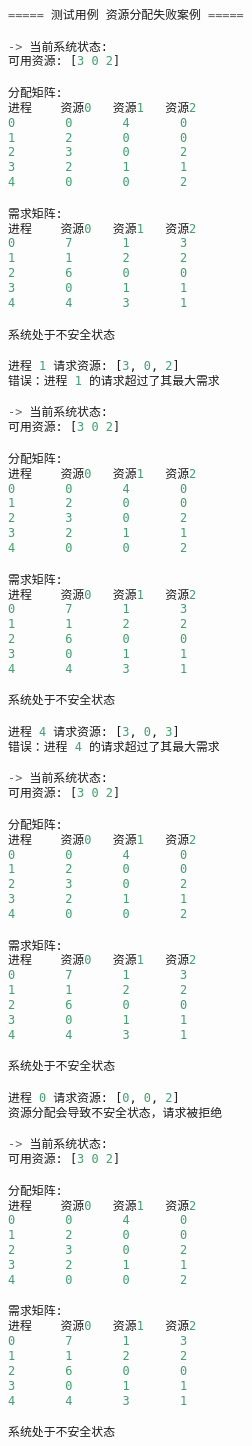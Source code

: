 \documentclass[12pt, a4paper, oneside]{ctexart}
\begin{document}
\begin{lstlisting}[language=Python, caption=测试用例二运行结果]
===== 测试用例 资源分配失败案例 =====

-> 当前系统状态:
可用资源: [3 0 2]

分配矩阵:
进程    资源0   资源1   资源2
0       0       4       0
1       2       0       0
2       3       0       2
3       2       1       1
4       0       0       2

需求矩阵:
进程    资源0   资源1   资源2
0       7       1       3
1       1       2       2
2       6       0       0
3       0       1       1
4       4       3       1

系统处于不安全状态

进程 1 请求资源: [3, 0, 2]
错误：进程 1 的请求超过了其最大需求

-> 当前系统状态:
可用资源: [3 0 2]

分配矩阵:
进程    资源0   资源1   资源2
0       0       4       0
1       2       0       0
2       3       0       2
3       2       1       1
4       0       0       2

需求矩阵:
进程    资源0   资源1   资源2
0       7       1       3
1       1       2       2
2       6       0       0
3       0       1       1
4       4       3       1

系统处于不安全状态

进程 4 请求资源: [3, 0, 3]
错误：进程 4 的请求超过了其最大需求

-> 当前系统状态:
可用资源: [3 0 2]

分配矩阵:
进程    资源0   资源1   资源2
0       0       4       0
1       2       0       0
2       3       0       2
3       2       1       1
4       0       0       2

需求矩阵:
进程    资源0   资源1   资源2
0       7       1       3
1       1       2       2
2       6       0       0
3       0       1       1
4       4       3       1

系统处于不安全状态

进程 0 请求资源: [0, 0, 2]
资源分配会导致不安全状态，请求被拒绝

-> 当前系统状态:
可用资源: [3 0 2]

分配矩阵:
进程    资源0   资源1   资源2
0       0       4       0
1       2       0       0
2       3       0       2
3       2       1       1
4       0       0       2

需求矩阵:
进程    资源0   资源1   资源2
0       7       1       3
1       1       2       2
2       6       0       0
3       0       1       1
4       4       3       1

系统处于不安全状态
\end{lstlisting}
\end{document}

